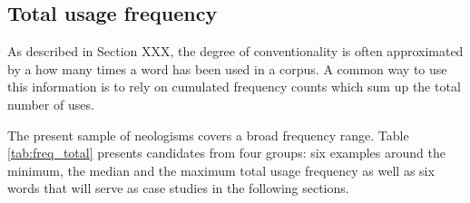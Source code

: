 \documentclass[draft, a4paper, abstract=on]{scrartcl}
\begin{document}
  \subsection{Total usage frequency}

  As described in Section XXX, the degree of conventionality is often approximated by a how many times a word has been used in a corpus. A common way to use this information is to rely on cumulated frequency counts which sum up the total number of uses.

  The present sample of neologisms covers a broad frequency range. Table \ref{tab:freq_total} presents candidates from four groups: six examples around the minimum, the median and the maximum total usage frequency as well as six words that will serve as case studies in the following sections.
\end{document}
